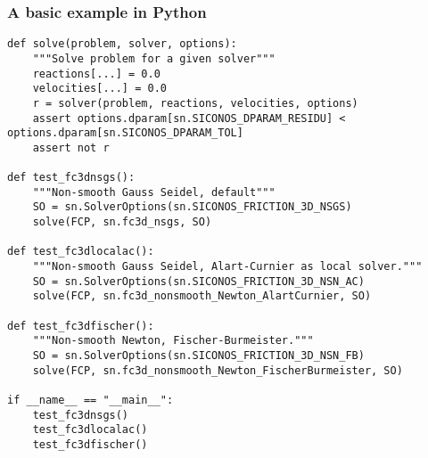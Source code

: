   
\begin{frame}[fragile]
  \frametitle{A basic example in Python}
    {\small
      \begin{verbatim}
def solve(problem, solver, options):
    """Solve problem for a given solver"""
    reactions[...] = 0.0
    velocities[...] = 0.0
    r = solver(problem, reactions, velocities, options)
    assert options.dparam[sn.SICONOS_DPARAM_RESIDU] < options.dparam[sn.SICONOS_DPARAM_TOL]
    assert not r

def test_fc3dnsgs():
    """Non-smooth Gauss Seidel, default"""
    SO = sn.SolverOptions(sn.SICONOS_FRICTION_3D_NSGS)
    solve(FCP, sn.fc3d_nsgs, SO)

def test_fc3dlocalac():
    """Non-smooth Gauss Seidel, Alart-Curnier as local solver."""
    SO = sn.SolverOptions(sn.SICONOS_FRICTION_3D_NSN_AC)
    solve(FCP, sn.fc3d_nonsmooth_Newton_AlartCurnier, SO)

def test_fc3dfischer():
    """Non-smooth Newton, Fischer-Burmeister."""
    SO = sn.SolverOptions(sn.SICONOS_FRICTION_3D_NSN_FB)
    solve(FCP, sn.fc3d_nonsmooth_Newton_FischerBurmeister, SO)

if __name__ == "__main__":
    test_fc3dnsgs()
    test_fc3dlocalac()
    test_fc3dfischer()
    

      \end{verbatim}
    }
  \end{frame}







  

